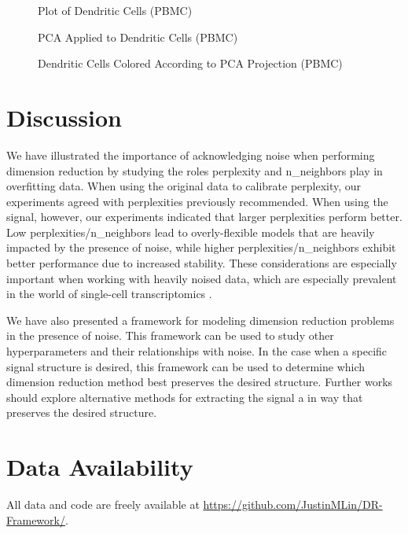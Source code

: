 \documentclass{article}
\begin{document}
\renewcommand{\thefigure}{18}
\begin{figure}[H]
\centering
\caption{Plot of Dendritic Cells (PBMC)}
\end{figure}

\renewcommand{\thefigure}{19}
\begin{figure}[H]
\centering
\caption{PCA Applied to Dendritic Cells (PBMC)}
\end{figure}

\renewcommand{\thefigure}{20}
\begin{figure}[H]
\centering
\caption{Dendritic Cells Colored According to PCA Projection (PBMC)}
\end{figure}

\section{Discussion}
We have illustrated the importance of acknowledging noise when performing dimension reduction by studying the roles perplexity and n\_neighbors play in overfitting data. When using the original data to calibrate perplexity, our experiments agreed with perplexities previously recommended. When using the signal, however, our experiments indicated that larger perplexities perform better. Low perplexities/n\_neighbors lead to overly-flexible models that are heavily impacted by the presence of noise, while higher perplexities/n\_neighbors exhibit better performance due to increased stability. These considerations are especially important when working with heavily noised data, which are especially prevalent in the world of single-cell transcriptomics \cite{noise in single-cell data}.

We have also presented a framework for modeling dimension reduction problems in the presence of noise. This framework can be used to study other hyperparameters and their relationships with noise. In the case when a specific signal structure is desired, this framework can be used to determine which dimension reduction method best preserves the desired structure. Further works should explore alternative methods for extracting the signal a in way that preserves the desired structure.


\section{Data Availability}
All data and code are freely available at \url{https://github.com/JustinMLin/DR-Framework/}.
\end{document}
